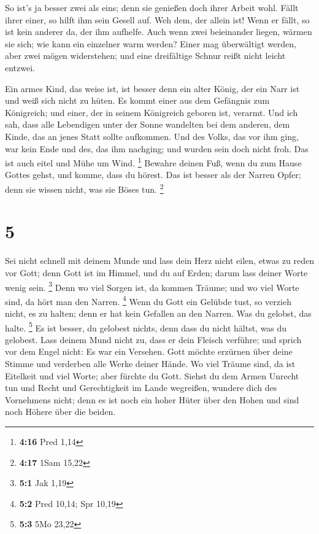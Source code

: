  So ist's ja besser zwei als eins; denn sie genießen doch
ihrer Arbeit wohl.  Fällt ihrer einer, so hilft ihm sein
Gesell auf. Weh dem, der allein ist! Wenn er fällt, so ist kein anderer
da, der ihm aufhelfe.  Auch wenn zwei beieinander liegen,
wärmen sie sich; wie kann ein einzelner warm werden?  Einer
mag überwältigt werden, aber zwei mögen widerstehen; und eine
dreifältige Schnur reißt nicht leicht entzwei.

 Ein armes Kind, das weise ist, ist besser denn ein alter
König, der ein Narr ist und weiß sich nicht zu hüten.  Es
kommt einer aus dem Gefängnis zum Königreich; und einer, der in seinem
Königreich geboren ist, verarmt.  Und ich sah, dass alle
Lebendigen unter der Sonne wandelten bei dem anderen, dem Kinde, das an
jenes Statt sollte aufkommen.  Und des Volks, das vor ihm
ging, war kein Ende und des, das ihm nachging; und wurden sein doch
nicht froh. Das ist auch eitel und Mühe um Wind. \footnote{\textbf{4:16}
  Pred 1,14}  Bewahre deinen Fuß, wenn du zum Hause Gottes
gehst, und komme, dass du hörest. Das ist besser als der Narren Opfer;
denn sie wissen nicht, was sie Böses tun. \footnote{\textbf{4:17} 1Sam
  15,22}

\hypertarget{section-1}{%
\section{5}\label{section-1}}

 Sei nicht schnell mit deinem Munde und lass dein Herz nicht
eilen, etwas zu reden vor Gott; denn Gott ist im Himmel, und du auf
Erden; darum lass deiner Worte wenig sein. \footnote{\textbf{5:1} Jak
  1,19}  Denn wo viel Sorgen ist, da kommen Träume; und wo
viel Worte sind, da hört man den Narren. \footnote{\textbf{5:2} Pred
  10,14; Spr 10,19}  Wenn du Gott ein Gelübde tust, so
verzieh nicht, es zu halten; denn er hat kein Gefallen an den Narren.
Was du gelobst, das halte. \footnote{\textbf{5:3} 5Mo 23,22}
 Es ist besser, du gelobest nichts, denn dass du nicht
hältst, was du gelobest.  Lass deinem Mund nicht zu, dass er
dein Fleisch verführe; und sprich vor dem Engel nicht: Es war ein
Versehen. Gott möchte erzürnen über deine Stimme und verderben alle
Werke deiner Hände.  Wo viel Träume sind, da ist Eitelkeit
und viel Worte; aber fürchte du Gott.  Siehst du dem Armen
Unrecht tun und Recht und Gerechtigkeit im Lande wegreißen, wundere dich
des Vornehmens nicht; denn es ist noch ein hoher Hüter über den Hohen
und sind noch Höhere über die beiden.

